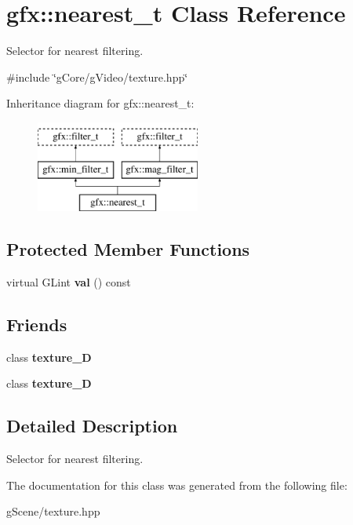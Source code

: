 \hypertarget{classgfx_1_1nearest__t}{\section{gfx\-:\-:nearest\-\_\-t Class Reference}
\label{classgfx_1_1nearest__t}
}


Selector for nearest filtering.  




{\ttfamily \#include \char`\"{}g\-Core/g\-Video/texture.\-hpp\char`\"{}}

Inheritance diagram for gfx\-:\-:nearest\-\_\-t\-:\begin{figure}[H]
\begin{center}
\leavevmode
\includegraphics[height=3.000000cm]{classgfx_1_1nearest__t}
\end{center}
\end{figure}
\subsection*{Protected Member Functions}
\begin{DoxyCompactItemize}
\item 
\hypertarget{classgfx_1_1nearest__t_ad8696065b222f006a37aebbc626455bf}{virtual G\-Lint {\bfseries val} () const }\label{classgfx_1_1nearest__t_ad8696065b222f006a37aebbc626455bf}

\end{DoxyCompactItemize}
\subsection*{Friends}
\begin{DoxyCompactItemize}
\item 
\hypertarget{classgfx_1_1nearest__t_a2039d67f6166ccf823c78e3476aad9aa}{class {\bfseries texture\-\_\-D}}\label{classgfx_1_1nearest__t_a2039d67f6166ccf823c78e3476aad9aa}

\item 
\hypertarget{classgfx_1_1nearest__t_a22ad86ef46c3b17357a0cd59e50bc7dd}{class {\bfseries texture\-\_\-D}}\label{classgfx_1_1nearest__t_a22ad86ef46c3b17357a0cd59e50bc7dd}

\end{DoxyCompactItemize}


\subsection{Detailed Description}
Selector for nearest filtering. 

The documentation for this class was generated from the following file\-:\begin{DoxyCompactItemize}
\item 
g\-Scene/texture.\-hpp\end{DoxyCompactItemize}
